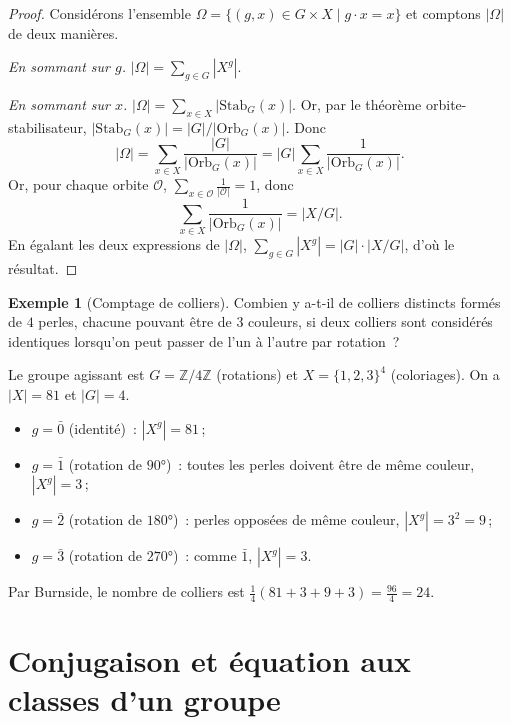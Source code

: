 \documentclass[12pt,a4paper,openany]{book}
\theoremstyle{definition}
\newtheorem{exemple}{Exemple}[chapter]
\newcommand{\Z}{\mathbb{Z}}
\begin{document}
\begin{proof}
  Considérons l'ensemble
  $\Omega = \{(g,x)\in G\times X \mid g\cdot x = x\}$
  et comptons $|\Omega|$ de deux manières.

  \emph{En sommant sur $g$.} $|\Omega| = \sum_{g\in G}|X^g|$.

  \emph{En sommant sur $x$.}
  $|\Omega| = \sum_{x\in X}|\mathrm{Stab}_G(x)|$.
  Or, par le théorème orbite-stabilisateur,
  $|\mathrm{Stab}_G(x)| = |G|/|\mathrm{Orb}_G(x)|$.
  Donc
  \[
    |\Omega| = \sum_{x\in X}\frac{|G|}{|\mathrm{Orb}_G(x)|}
    = |G|\sum_{x\in X}\frac{1}{|\mathrm{Orb}_G(x)|}.
  \]
  Or, pour chaque orbite $\mathcal{O}$,
  $\sum_{x\in\mathcal{O}}\frac{1}{|\mathcal{O}|} = 1$, donc
  \[
    \sum_{x\in X}\frac{1}{|\mathrm{Orb}_G(x)|} = |X/G|.
  \]
  En égalant les deux expressions de $|\Omega|$,
  $\sum_{g\in G}|X^g| = |G|\cdot|X/G|$, d'où le résultat.
\end{proof}

\begin{exemple}[Comptage de colliers]\label{ex:colliers}
  Combien y a-t-il de colliers distincts formés de $4$
  perles, chacune pouvant être de $3$ couleurs, si deux colliers sont
  considérés identiques lorsqu'on peut passer de l'un à l'autre par
  rotation~?

  Le groupe agissant est $G=\Z/4\Z$ (rotations) et
  $X = \{1,2,3\}^4$ (coloriages).
  On a $|X|=81$ et $|G|=4$.
  \begin{itemize}
    \item $g=\bar{0}$ (identité)~: $|X^g| = 81$\,;
    \item $g=\bar{1}$ (rotation de $90°$)~: toutes les perles doivent
      être de même couleur, $|X^g|=3$\,;
    \item $g=\bar{2}$ (rotation de $180°$)~: perles opposées de même
      couleur, $|X^g|=3^2=9$\,;
    \item $g=\bar{3}$ (rotation de $270°$)~: comme $\bar{1}$,
      $|X^g|=3$.
  \end{itemize}
  Par Burnside, le nombre de colliers est
  $\frac{1}{4}(81+3+9+3) = \frac{96}{4} = 24$.
\end{exemple}

\section{Conjugaison et équation aux classes d'un groupe}\label{sec:conjugaison}
\end{document}
